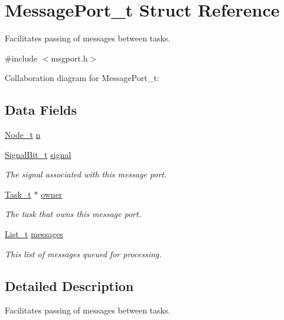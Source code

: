 \hypertarget{structMessagePort__t}{\section{Message\+Port\+\_\+t Struct Reference}
\label{structMessagePort__t}
}


Facilitates passing of messages between tasks.  




{\ttfamily \#include $<$msgport.\+h$>$}



Collaboration diagram for Message\+Port\+\_\+t\+:
\subsection*{Data Fields}
\begin{DoxyCompactItemize}
\item 
\hyperlink{structNode__t}{Node\+\_\+t} \hyperlink{structMessagePort__t_aef6611866e17a017727b3d3d317beeb7}{n}
\item 
\hyperlink{task_8h_a2a2b5b7da9f241ac42373a0ada8ccd0c}{Signal\+Bit\+\_\+t} \hyperlink{structMessagePort__t_a6edbc6af8afbde167057928a7b45c793}{signal}
\begin{DoxyCompactList}\small\item\em The signal associated with this message port. \end{DoxyCompactList}\item 
\hyperlink{structTask__t}{Task\+\_\+t} $\ast$ \hyperlink{structMessagePort__t_a38ef8fc428ef33c108d1734731d1b40e}{owner}
\begin{DoxyCompactList}\small\item\em The task that owns this message port. \end{DoxyCompactList}\item 
\hyperlink{structList__t}{List\+\_\+t} \hyperlink{structMessagePort__t_ac205ddab2edee9954f8b0ad22bd29d09}{messages}
\begin{DoxyCompactList}\small\item\em This list of messages queued for processing. \end{DoxyCompactList}\end{DoxyCompactItemize}


\subsection{Detailed Description}
Facilitates passing of messages between tasks. 

